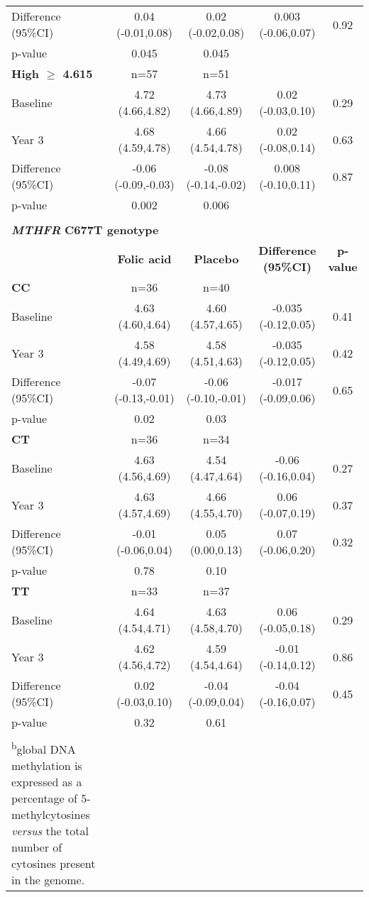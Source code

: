 \begin{longtable}{lcccc}
 Difference (95\%CI) & 0.04 (-0.01,0.08) & 0.02 (-0.02,0.08) & 0.003 (-0.06,0.07) & 0.92\\
 p-value & 0.045 & 0.045 & ~ & ~ \\
\bfseries High ${\geq}$ 4.615 & n=57 & n=51 & ~ & ~ \\
 Baseline & 4.72 (4.66,4.82) & 4.73 (4.66,4.89) & 0.02 (-0.03,0.10) & 0.29\\
 Year 3 & 4.68 (4.59,4.78) & 4.66 (4.54,4.78) & 0.02 (-0.08,0.14) & 0.63\\
 Difference (95\%CI) & {}-0.06 (-0.09,-0.03) & {}-0.08 (-0.14,-0.02) & 0.008 (-0.10,0.11) & 0.87\\
 p-value & 0.002 & 0.006 & ~ & ~ \\
 \\
\multicolumn{5}{l}{\textbf{\textit{MTHFR}}\textbf{ C677T genotype}}\\
~ & \bfseries Folic acid & \bfseries Placebo & \bfseries Difference (95\%CI) & \bfseries p-value\\
\bfseries CC & n=36 & n=40 & ~ & ~ \\
 Baseline & 4.63 (4.60,4.64) & 4.60 (4.57,4.65) & {}-0.035 (-0.12,0.05) & 0.41\\
 Year 3 & 4.58 (4.49,4.69) & 4.58 (4.51,4.63) & {}-0.035 (-0.12,0.05) & 0.42\\
 Difference (95\%CI) & {}-0.07 (-0.13,-0.01) & {}-0.06 (-0.10,-0.01) & {}-0.017 (-0.09,0.06) & 0.65\\
 p-value & 0.02 & 0.03 & ~ & ~ \\
\bfseries CT & n=36 & n=34 & ~ & ~ \\
 Baseline & 4.63 (4.56,4.69) & 4.54 (4.47,4.64) & {}-0.06 (-0.16,0.04) & 0.27\\
 Year 3 & 4.63 (4.57,4.69) & 4.66 (4.55,4.70) & 0.06 (-0.07,0.19) & 0.37\\
 Difference (95\%CI) & {}-0.01 (-0.06,0.04) & 0.05 (0.00,0.13) & 0.07 (-0.06,0.20) & 0.32\\
 p-value & 0.78 & 0.10 & ~ & ~ \\
\bfseries TT & n=33 & n=37 & ~ & ~ \\
 Baseline & 4.64 (4.54,4.71) & 4.63 (4.58,4.70) & 0.06 (-0.05,0.18) & 0.29\\
 Year 3 & 4.62 (4.56,4.72) & 4.59 (4.54,4.64) & {}-0.01 (-0.14,0.12) & 0.86\\
 Difference (95\%CI) & 0.02 (-0.03,0.10) & {}-0.04 (-0.09,0.04) & {}-0.04 (-0.16,0.07) & 0.45\\
 p-value & 0.32 & 0.61 & ~ & ~ \\
\hline
\caption*{\footnotesize{\textsuperscript{a}values are given as median (inter-quartile range).\\\textsuperscript{b}global DNA methylation is expressed as a percentage of 5-methylcytosines \emph{versus} the total number of cytosines present in the genome.}}
\end{longtable}


